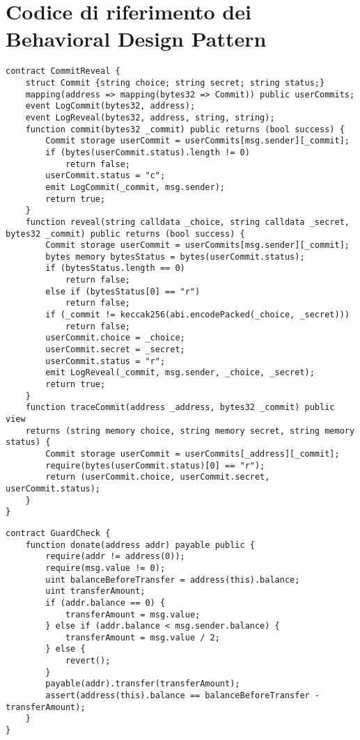 {\section{Codice di riferimento dei Behavioral Design Pattern}

{\label{appendix:commit_and_reveal}\begin{lstlisting}[language=Solidity, caption={Codice di riferimento per Commit and Reveal}]
contract CommitReveal {
	struct Commit {string choice; string secret; string status;}
	mapping(address => mapping(bytes32 => Commit)) public userCommits;
	event LogCommit(bytes32, address);
	event LogReveal(bytes32, address, string, string);
	function commit(bytes32 _commit) public returns (bool success) {
		Commit storage userCommit = userCommits[msg.sender][_commit];
		if (bytes(userCommit.status).length != 0)
			return false;
		userCommit.status = "c";
		emit LogCommit(_commit, msg.sender);
		return true;
	}
	function reveal(string calldata _choice, string calldata _secret, bytes32 _commit) public returns (bool success) {
		Commit storage userCommit = userCommits[msg.sender][_commit];
		bytes memory bytesStatus = bytes(userCommit.status);
		if (bytesStatus.length == 0)
			return false;
		else if (bytesStatus[0] == "r")
			return false;
		if (_commit != keccak256(abi.encodePacked(_choice, _secret)))
			return false; 
		userCommit.choice = _choice;
		userCommit.secret = _secret;
		userCommit.status = "r";
		emit LogReveal(_commit, msg.sender, _choice, _secret);
		return true;
	}
	function traceCommit(address _address, bytes32 _commit) public view
	returns (string memory choice, string memory secret, string memory status) {
		Commit storage userCommit = userCommits[_address][_commit];
		require(bytes(userCommit.status)[0] == "r");
		return (userCommit.choice, userCommit.secret, userCommit.status);
	}
}
\end{lstlisting}}

{\label{appendix:guardcheck}\begin{lstlisting}[language=Solidity, caption={Codice di riferimento per GuardCheck}]
contract GuardCheck {
	function donate(address addr) payable public {
		require(addr != address(0));
		require(msg.value != 0);
		uint balanceBeforeTransfer = address(this).balance;
		uint transferAmount;
		if (addr.balance == 0) {
			transferAmount = msg.value;
		} else if (addr.balance < msg.sender.balance) {
			transferAmount = msg.value / 2;
		} else {
			revert();
		}
		payable(addr).transfer(transferAmount);
		assert(address(this).balance == balanceBeforeTransfer - transferAmount);      
	}
}
\end{lstlisting}}

}
